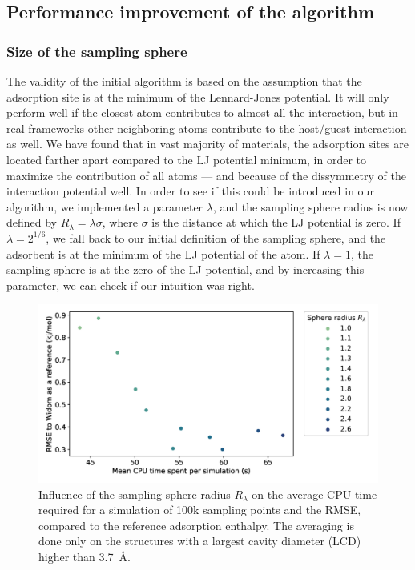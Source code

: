 \documentclass[main]{subfiles}
\begin{document}
\subsection{Performance improvement of the algorithm}

\subsubsection{Size of the sampling sphere}

The validity of the initial algorithm is based on the assumption that the adsorption site is at the minimum of the Lennard-Jones potential. It will only perform well if the closest atom contributes to almost all the interaction, but in real frameworks other neighboring atoms contribute to the host/guest interaction as well. We have found that in vast majority of materials, the adsorption sites are located farther apart compared to the LJ potential minimum, in order to maximize the contribution of all atoms --- and because of the dissymmetry of the interaction potential well. In order to see if this could be introduced in our algorithm, we implemented a parameter $\lambda$, and the sampling sphere radius is now defined by $R_{\lambda} = \lambda \sigma$, where $\sigma$ is the distance at which the LJ potential is zero. If $\lambda=2^{1/6}$, we fall back to our initial definition of the sampling sphere, and the adsorbent is at the minimum of the LJ potential of the atom. If $\lambda=1$, the sampling sphere is at the zero of the LJ potential, and by increasing this parameter, we can check if our intuition was right.

\begin{figure}[ht]
\centering
  \includegraphics[width=0.7\linewidth]{figures/3-fastsim/sphere_size_optimisation.png}
  \caption{Influence of the sampling sphere radius $R_{\lambda}$ on the average CPU time required for a simulation of 100k sampling points and the RMSE, compared to the reference adsorption enthalpy. The averaging is done only on the structures with a largest cavity diameter (LCD) higher than \SI{3.7}{\angstrom}.}
  \label{fgr:radius}
\end{figure}
\end{document}
